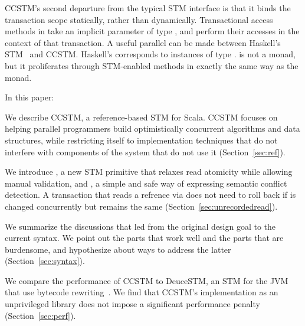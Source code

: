 CCSTM's second departure from the typical STM interface is that it binds the
transaction scope statically, rather than dynamically.  Transactional access
methods in  take an implicit parameter of type , and
perform their accesses in the context of that transaction.
A useful parallel can be made between Haskell's STM~\cite{harris05ctm} and CCSTM.
Haskell's  corresponds to instances of type .
 is not a monad, but it proliferates through STM-enabled
methods in exactly the same way as the  monad.

In this paper:
\begin{packed_enum}

\item We describe CCSTM, a reference-based STM for Scala.  CCSTM focuses on
helping parallel programmers build optimistically concurrent algorithms
and data structures, while restricting itself to implementation techniques
that do not interfere with components of the system that do not use it
(Section~\ref{sec:ref}).

\item We introduce , a new STM primitive that relaxes
read atomicity while allowing manual validation, and , a simple
and safe way of expressing semantic conflict detection.  A transaction
that reads a refrence  via  does not need to roll
back if  is changed concurrently but  remains
the same (Section~\ref{sec:unrecordedread}).

\item We summarize the discussions that led from the original design goal to
the current syntax.  We point out the parts that work well and the parts that
are burdensome, and hypothesize about ways to address the latter
(Section~\ref{sec:syntax}).

\item We compare the performance of CCSTM to DeuceSTM, an STM for
the JVM that use bytecode rewriting~\cite{deucestm}.
We find that CCSTM's implementation as an
unprivileged library does not impose a significant performance penalty
(Section~\ref{sec:perf}).

\end{packed_enum}


